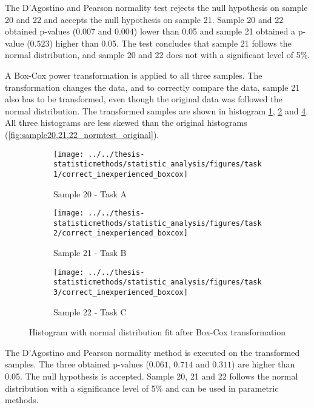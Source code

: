 \begin{appendices}
The D'Agostino and Pearson normality test rejects the null hypothesis on sample 20 and 22 and accepts the null hypothesis on sample 21. Sample 20 and 22 obtained p-values ($0.007$ and $0.004$) lower than 0.05 and sample 21 obtained a p-value ($0.523$) higher than 0.05. The test concludes that sample 21 follows the normal distribution, and sample 20 and 22 does not with a significant level of 5\%. 

A Box-Cox power transformation is applied to all three samples. The transformation changes the data, and to correctly compare the data, sample 21 also has to be transformed, even though the original data was followed the normal distribution. The transformed samples are shown in histogram \ref{fig:correctinexperiencedboxcox_task1}, \ref{fig:correctinexperiencedboxcox_task2} and \ref{fig:correctinexperiencedboxcox_task3}. All three histograms are less skewed than the original histograms (\ref{fig:sample20,21,22_normtest_original}).

\begin{figure}[H]
	\centering
	\begin{subfigure}[b]{0.32\textwidth}
		\centering
		\texttt{[image: ../../thesis-statisticmethods/statistic\_analysis/figures/task1/correct\_inexperienced\_boxcox]}
		\caption{Sample 20 - Task A}
		\label{fig:correctinexperiencedboxcox_task1}
	\end{subfigure}
	\begin{subfigure}[b]{0.32\textwidth}
		\centering
		\texttt{[image: ../../thesis-statisticmethods/statistic\_analysis/figures/task2/correct\_inexperienced\_boxcox]}
		\caption{Sample 21 - Task B}
		\label{fig:correctinexperiencedboxcox_task2}
	\end{subfigure}
	\begin{subfigure}[b]{0.32\textwidth}
		\centering
		\texttt{[image: ../../thesis-statisticmethods/statistic\_analysis/figures/task3/correct\_inexperienced\_boxcox]}
		\caption{Sample 22 - Task C}
		\label{fig:correctinexperiencedboxcox_task3}
	\end{subfigure}
	\caption{Histogram with normal distribution fit after Box-Cox transformation}
\end{figure}

The D'Agostino and Pearson normality method is executed on the transformed samples. The three obtained p-values ($0.061$, $0.714$ and $0.311$) are higher than 0.05. The null hypothesis is accepted. Sample 20, 21 and 22 follows the normal distribution with a significance level of 5\% and can be used in parametric methods.  

\end{appendices}
